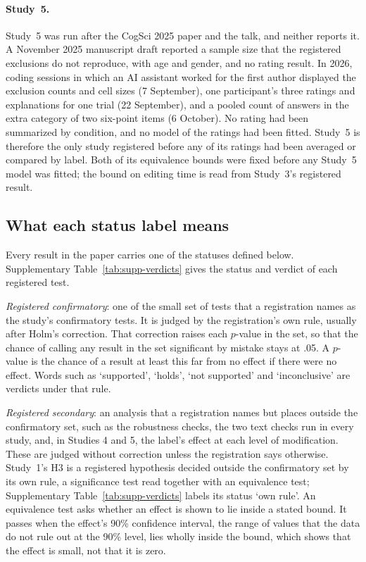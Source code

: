 \paragraph*{Study~5.}
Study~5 was run after the CogSci 2025 paper and the talk, and neither reports it. A November 2025 manuscript draft reported a sample size that the registered exclusions do not reproduce, with age and gender, and no rating result. In 2026, coding sessions in which an AI assistant worked for the first author displayed the exclusion counts and cell sizes (7 September), one participant's three ratings and explanations for one trial (22 September), and a pooled count of answers in the extra category of two six-point items (6 October). No rating had been summarized by condition, and no model of the ratings had been fitted. Study~5 is therefore the only study registered before any of its ratings had been averaged or compared by label. Both of its equivalence bounds were fixed before any Study~5 model was fitted; the bound on editing time is read from Study~3's registered result.

\subsection*{What each status label means}

Every result in the paper carries one of the statuses defined below. Supplementary Table~\ref{tab:supp-verdicts} gives the status and verdict of each registered test.

\emph{Registered confirmatory}: one of the small set of tests that a registration names as the study's confirmatory tests. It is judged by the registration's own rule, usually after Holm's correction.\cite{holm1979simple} That correction raises each $p$-value in the set, so that the chance of calling any result in the set significant by mistake stays at .05. A $p$-value is the chance of a result at least this far from no effect if there were no effect. Words such as `supported', `holds', `not supported' and `inconclusive' are verdicts under that rule.

\emph{Registered secondary}: an analysis that a registration names but places outside the confirmatory set, such as the robustness checks, the two text checks run in every study, and, in Studies 4 and 5, the label's effect at each level of modification. These are judged without correction unless the registration says otherwise. Study~1's H3 is a registered hypothesis decided outside the confirmatory set by its own rule, a significance test read together with an equivalence test; Supplementary Table~\ref{tab:supp-verdicts} labels its status `own rule'. An equivalence test asks whether an effect is shown to lie inside a stated bound. It passes when the effect's 90\% confidence interval, the range of values that the data do not rule out at the 90\% level, lies wholly inside the bound, which shows that the effect is small, not that it is zero.\cite{schuirmann1987comparison,lakens2017equivalence}

